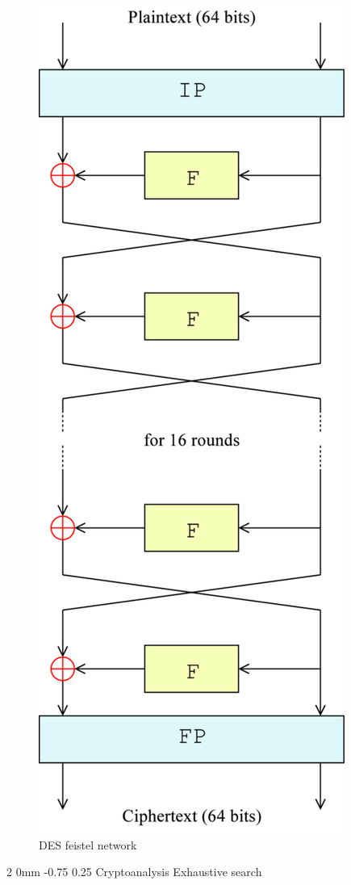 \documentclass[a4paper,11pt]{article}
\makeatletter
\renewcommand{\subsection}{\@startsection
   {subsection}%
   {2}%
   {0mm}%
   {-0.75\baselineskip}%
   {0.25\baselineskip}%
   {\rmfamily\normalfont\slshape\normalsize}}%
\makeatother
\begin{document}
\begin{figure}[H]
  \centering
  \includegraphics[scale=0.2]{des.png}
  \caption{DES feistel network}
\end{figure}
\subsection{Cryptoanalysis}
Exhaustive search
\end{document}
